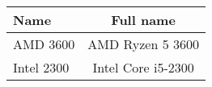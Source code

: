 \begin{tabular}{|l|c|}
  \hline
  Name       & Full name          \\
  \hline
  AMD 3600   & AMD Ryzen 5 3600   \\
  Intel 2300 & Intel Core i5-2300 \\
  \hline
\end{tabular}
